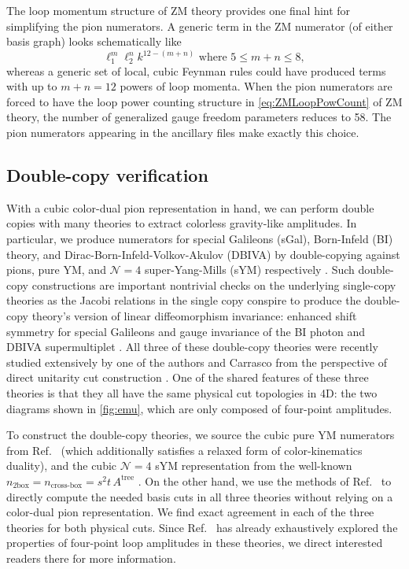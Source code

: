 \documentclass[11pt,letter]{article}
\newcommand{\atree}{\ensuremath{A^{\text{tree}}}}
\begin{document}
The loop momentum structure of ZM theory provides one final hint for
simplifying the pion numerators.  A generic term in the ZM numerator
(of either basis graph) looks schematically like
\begin{equation}
\label{eq:ZMLoopPowCount}
\ell_1^m \ell_2^n k^{12-(m+n)} \text{ where } 5 \leq m+n \leq 8,
\end{equation}
whereas a generic set of local, cubic Feynman rules could have
produced terms with up to $m+n=12$ powers of loop momenta.  When the
pion numerators are forced to have the loop power counting structure in
\cref{eq:ZMLoopPowCount} of ZM theory, the number of generalized gauge
freedom parameters reduces to 58.  The pion numerators appearing in the
ancillary files make exactly this choice.

\subsection{Double-copy verification}
\label{doubleCopyVerify}

With a cubic color-dual pion representation in hand, we can perform
double copies with many theories to extract colorless gravity-like
amplitudes.  In particular, we produce numerators for special
Galileons (sGal), Born-Infeld (BI) theory, and Dirac-Born-Infeld-Volkov-Akulov (DBIVA) by double-copying against
pions, pure YM, and $\mathcal{N}=4$ super-Yang-Mills (sYM) respectively
\cite{Cachazo:2014xea,Cheung:2015ota,Cheung:2016drk}.  Such double-copy constructions are important nontrivial
checks on the underlying single-copy theories as the Jacobi relations
in the single copy conspire to produce the double-copy theory's
version of linear diffeomorphism invariance: enhanced shift symmetry for special Galileons and gauge
invariance of the BI photon and DBIVA supermultiplet \cite{Hinterbichler:2015pqa}.  All
three of these double-copy theories were recently studied extensively
by one of the authors and Carrasco from the perspective of direct
unitarity cut construction \cite{Carrasco:2023qgz}.  One of the shared
features of these three theories is that they all have the same
physical cut topologies in 4D: the two diagrams shown in
\cref{fig:emu}, which are only composed of four-point amplitudes.

To construct the double-copy theories, we source the cubic
pure YM numerators from Ref.~\cite{Bern:2015ooa} (which
additionally satisfies a relaxed form of color-kinematics duality),
and the cubic $\mathcal{N}=4$ sYM representation from the well-known
$n_{2\text{box}} = n_{\text{cross-box}} = s^2t\, \atree$ \cite{Bern:1997nh}.
On the other hand, we use the methods of Ref.~\cite{Carrasco:2023qgz}
to directly compute the needed basis cuts in all three theories without
relying on a color-dual pion representation.  We find exact agreement
in each of the three theories for both physical cuts.  Since
Ref.~\cite{Carrasco:2023qgz} has already exhaustively explored the
properties of four-point loop amplitudes in these theories, we direct
interested readers there for more information.
\end{document}
